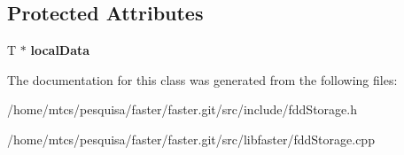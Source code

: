 \subsection*{Protected Attributes}
\begin{DoxyCompactItemize}
\item 
\hypertarget{classfaster_1_1fddStorageCore_af2b22b0cda86b521472708991c38b797}{}\label{classfaster_1_1fddStorageCore_af2b22b0cda86b521472708991c38b797} 
T $\ast$ {\bfseries local\+Data}
\end{DoxyCompactItemize}


The documentation for this class was generated from the following files\+:\begin{DoxyCompactItemize}
\item 
/home/mtcs/pesquisa/faster/faster.\+git/src/include/fdd\+Storage.\+h\item 
/home/mtcs/pesquisa/faster/faster.\+git/src/libfaster/fdd\+Storage.\+cpp\end{DoxyCompactItemize}
